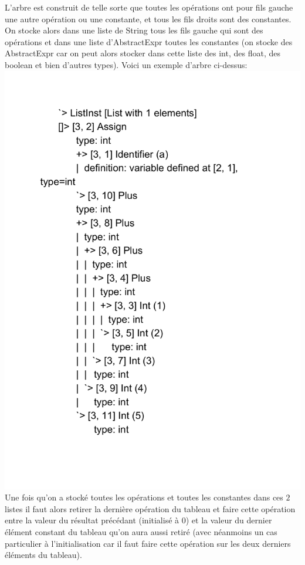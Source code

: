 \documentclass[a4paper]{article}
\begin{document}
L'arbre est construit de telle sorte que toutes les opérations ont pour fils gauche une autre opération ou une constante, et tous les fils droits sont des constantes. On stocke alors dans une liste de String tous les fils gauche qui sont des opérations et dans une liste d'AbstractExpr toutes les constantes (on stocke des AbstractExpr car on peut alors stocker dans cette liste des int, des float, des boolean et bien d'autres types). Voici un exemple d'arbre ci-dessus:\\
\includegraphics[scale=0.5]{Arbre_enrichi.pdf}\\
Une fois qu'on a stocké toutes les opérations et toutes les constantes dans ces $2$ listes il faut alors retirer la dernière opération du tableau et faire cette opération entre la valeur du résultat précédant (initialisé à 0) et la valeur du dernier élément constant du tableau qu'on aura aussi retiré (avec néanmoins un cas particulier à l'initialisation car il faut faire cette opération sur les deux derniers éléments du tableau).\\ \\
\end{document}
